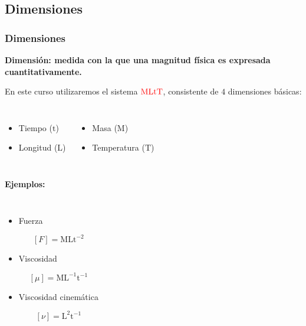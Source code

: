 \documentclass[t]{beamer}
\begin{document}
\subsection{Dimensiones}
\begin{frame}
\frametitle{Dimensiones}
\textbf{Dimensión: medida con la que una magnitud física es expresada cuantitativamente.}
\vspace{0.2cm}

En este curso utilizaremos el sistema $\mathrm{\color{red}{MLtT}}$, consistente de $4$ dimensiones básicas:
\vspace{-0.5cm}

\begin{columns}
\begin{itemize}
\item Tiempo ($\mathrm{t}$)
\item Longitud ($\mathrm{L}$)
\end{itemize}

\begin{itemize}
\item Masa ($\mathrm{M}$)
\item Temperatura ($\mathrm{T}$)
\end{itemize}

\end{columns}
\vspace{0.5cm}

\textbf{Ejemplos:}
\vspace{-0.5cm}

\begin{columns}
\begin{itemize}
\item Fuerza
\vspace{-0.5cm}

$$[F] = \mathrm{MLt^{-2}}$$
\vspace{-0.6cm}

\item Viscosidad
\vspace{-0.5cm}

$$[\mu] = \mathrm{ML^{-1}t^{-1}}$$
\vspace{-0.6cm}

\item Viscosidad cinemática
\vspace{-0.5cm}

$$[\nu] = \mathrm{L^{2}t^{-1}}$$

\end{itemize}


\end{columns}
\end{frame}
\end{document}
